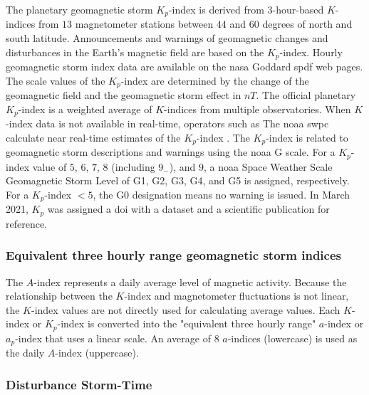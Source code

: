 \let\LaTeXcline\cline\documentclass[sn-mathphys-num]{sn-jnl}\let\cline\LaTeXcline
\begin{document}
The planetary geomagnetic storm $K_{p}$-index is derived from $3$-hour-based $K$-indices from $13$ magnetometer stations between $44$ and $60$ degrees of north and south latitude. Announcements and warnings of geomagnetic changes and disturbances in the Earth's magnetic field are based on the $K_{p}$-index. Hourly geomagnetic storm index data are available on the \acrshort{nasa} Goddard \acrshort{spdf} web pages. The scale values of the $K_{p}$-index are determined by the change of the geomagnetic field and the geomagnetic storm effect in $nT$. The official planetary $K_{p}$-index is a weighted average of $K$-indices from multiple observatories. When $K$-index data is not available in real-time, operators such as The \acrfull{noaa} \acrfull{swpc} calculate near real-time estimates of the $K_{p}$-index \cite{Myint2022}. The $K_{p}$-index is related to geomagnetic storm descriptions and warnings using the \acrshort{noaa} G scale. For a $K_{p}$-index value of $5$, $6$, $7$, $8$ (including $9_{-}$), and $9$, a \acrshort{noaa} Space Weather Scale Geomagnetic Storm Level of G1, G2, G3, G4, and G5 is assigned, respectively. For a $K_{p}$-index $<5$, the G0 designation means no warning is issued. In March 2021, $K_{p}$ was assigned a \acrfull{doi} with a dataset \cite{Matzka2021a} and a scientific publication \cite{Matzka2021b} for reference.

\subsubsection{Equivalent three hourly range geomagnetic storm indices}

The $A$-index represents a daily average level of magnetic activity. Because the relationship between the $K$-index and magnetometer fluctuations is not linear, the $K$-index values are not directly used for calculating average values. Each $K$-index or $K_{p}$-index is converted into the "equivalent three hourly range" $a$-index or $a_{p}$-index that uses a linear scale. An average of $8$ $a$-indices (lowercase) is used as the daily $A$-index (uppercase).  

\subsubsection{Disturbance Storm-Time}
\end{document}
